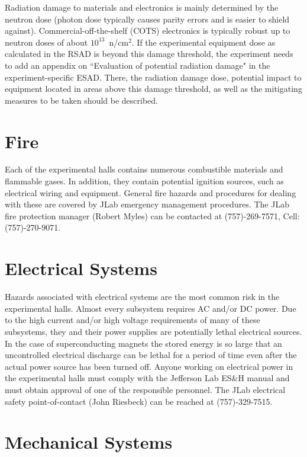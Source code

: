 \documentclass[12pt]{report}
\begin{document}
Radiation damage to materials and electronics is mainly determined by the neutron 
dose (photon dose typically causes parity errors and is easier to shield against). 
Commercial-off-the-shelf (COTS) electronics is typically robust up to neutron doses of 
about $10^{13}$~n/cm$^2$. If the experimental equipment dose as calculated in the RSAD 
is beyond this damage threshold, the experiment needs to add an appendix on ``Evaluation 
of potential radiation damage" in the experiment-specific ESAD. There, the radiation 
damage dose, potential impact to equipment located in areas above this damage threshold, 
as well as the mitigating measures to be taken should be described.

\section{Fire}

Each of the experimental halls contains numerous combustible materials and flammable gases. 
In addition, they contain potential ignition sources, such as electrical wiring and equipment. 
General fire hazards and procedures for dealing with these are covered by JLab emergency 
management procedures. The JLab fire protection manager (Robert Myles) can be contacted at 
(757)-269-7571, Cell: (757)-270-9071.

\section{Electrical Systems}

Hazards associated with electrical systems are the most common risk in the experimental 
halls. Almost every subsystem requires AC and/or DC power. Due to the high current and/or 
high voltage requirements of many of these subsystems, they and their power supplies are 
potentially lethal electrical sources. In the case of superconducting magnets the stored 
energy is so large that an uncontrolled electrical discharge can be lethal for a period of 
time even after the actual power source has been turned off. Anyone working on electrical 
power in the experimental halls must comply with the Jefferson Lab 
ES\&H manual and must obtain approval of one of the responsible personnel. The JLab 
electrical safety point-of-contact (John Riesbeck) can be reached at (757)-329-7515.

\section{Mechanical Systems}
\end{document}

